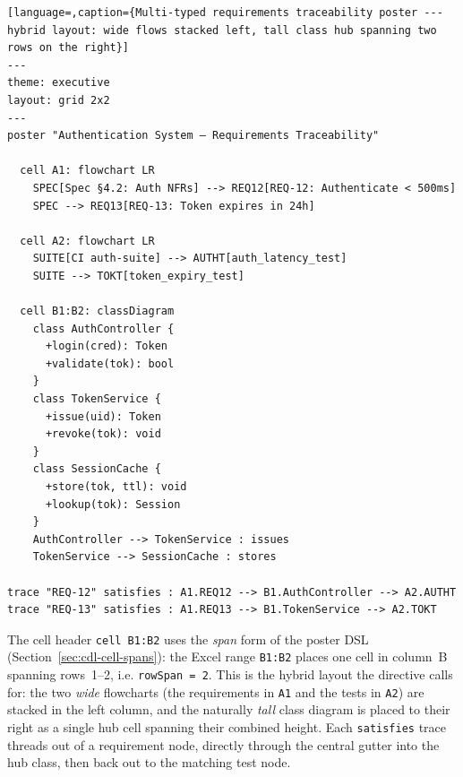 \begin{lstlisting}[language=,caption={Multi-typed requirements traceability poster --- hybrid layout: wide flows stacked left, tall class hub spanning two rows on the right}]
---
theme: executive
layout: grid 2x2
---
poster "Authentication System — Requirements Traceability"

  cell A1: flowchart LR
    SPEC[Spec §4.2: Auth NFRs] --> REQ12[REQ-12: Authenticate < 500ms]
    SPEC --> REQ13[REQ-13: Token expires in 24h]

  cell A2: flowchart LR
    SUITE[CI auth-suite] --> AUTHT[auth_latency_test]
    SUITE --> TOKT[token_expiry_test]

  cell B1:B2: classDiagram
    class AuthController {
      +login(cred): Token
      +validate(tok): bool
    }
    class TokenService {
      +issue(uid): Token
      +revoke(tok): void
    }
    class SessionCache {
      +store(tok, ttl): void
      +lookup(tok): Session
    }
    AuthController --> TokenService : issues
    TokenService --> SessionCache : stores

trace "REQ-12" satisfies : A1.REQ12 --> B1.AuthController --> A2.AUTHT
trace "REQ-13" satisfies : A1.REQ13 --> B1.TokenService --> A2.TOKT
\end{lstlisting}

The cell header \texttt{cell B1:B2} uses the \emph{span} form of the poster DSL
(Section~\ref{sec:cdl-cell-spans}): the Excel range \texttt{B1:B2} places one
cell in column~B spanning rows~1--2, i.e. \texttt{rowSpan = 2}.  This is the
hybrid layout the directive calls for: the two \emph{wide} flowcharts (the
requirements in \texttt{A1} and the tests in \texttt{A2}) are stacked in the
left column, and the naturally \emph{tall} class diagram is placed to their
right as a single hub cell spanning their combined height.  Each
\texttt{satisfies} trace threads out of a requirement node, directly through the
central gutter into the hub class, then back out to the matching test node.


